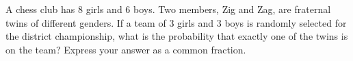 A chess club has $8$ girls and $6$ boys. Two members, Zig and Zag, are fraternal twins of different genders. If a team of $3$ girls and $3$ boys is randomly selected for the district championship, what is the probability that exactly one of the twins is on the team? Express your answer as a common fraction.
